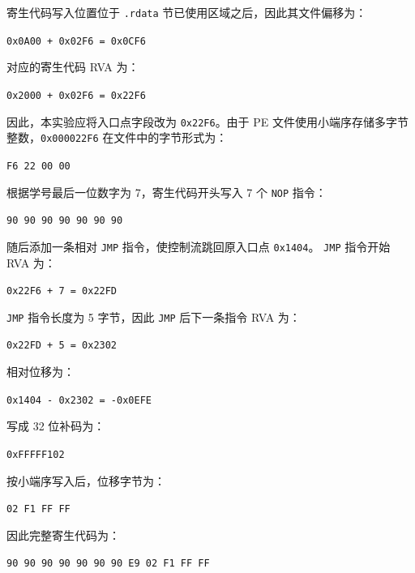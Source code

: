 ﻿\documentclass[12pt]{ctexart}
\begin{document}
寄生代码写入位置位于 \texttt{.rdata} 节已使用区域之后，因此其文件偏移为：

\begin{center}
\texttt{0x0A00 + 0x02F6 = 0x0CF6}
\end{center}

对应的寄生代码 RVA 为：

\begin{center}
\texttt{0x2000 + 0x02F6 = 0x22F6}
\end{center}

因此，本实验应将入口点字段改为 \texttt{0x22F6}。由于 PE 文件使用小端序存储多字节整数，\texttt{0x000022F6} 在文件中的字节形式为：

\begin{center}
\texttt{F6 22 00 00}
\end{center}

根据学号最后一位数字为 7，寄生代码开头写入 7 个 \texttt{NOP} 指令：

\begin{center}
\texttt{90 90 90 90 90 90 90}
\end{center}

随后添加一条相对 \texttt{JMP} 指令，使控制流跳回原入口点 \texttt{0x1404}。 \texttt{JMP} 指令开始 RVA 为：

\begin{center}
\texttt{0x22F6 + 7 = 0x22FD}
\end{center}

\texttt{JMP} 指令长度为 5 字节，因此 \texttt{JMP} 后下一条指令 RVA 为：

\begin{center}
\texttt{0x22FD + 5 = 0x2302}
\end{center}

相对位移为：

\begin{center}
\texttt{0x1404 - 0x2302 = -0x0EFE}
\end{center}

写成 32 位补码为：

\begin{center}
\texttt{0xFFFFF102}
\end{center}

按小端序写入后，位移字节为：

\begin{center}
\texttt{02 F1 FF FF}
\end{center}

因此完整寄生代码为：

\begin{center}
\texttt{90 90 90 90 90 90 90 E9 02 F1 FF FF}
\end{center}
\end{document}
